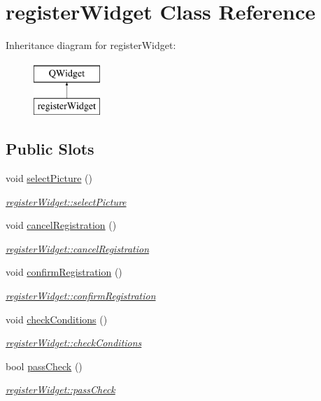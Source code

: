\hypertarget{classregisterWidget}{\section{register\-Widget Class Reference}
\label{classregisterWidget}
}
Inheritance diagram for register\-Widget\-:\begin{figure}[H]
\begin{center}
\leavevmode
\includegraphics[height=2.000000cm]{classregisterWidget}
\end{center}
\end{figure}
\subsection*{Public Slots}
\begin{DoxyCompactItemize}
\item 
void \hyperlink{classregisterWidget_a69c2a6929e0adbd79b215812cb7c582f}{select\-Picture} ()
\begin{DoxyCompactList}\small\item\em \hyperlink{classregisterWidget_a69c2a6929e0adbd79b215812cb7c582f}{register\-Widget\-::select\-Picture} \end{DoxyCompactList}\item 
void \hyperlink{classregisterWidget_a571a61e4b370f821cc5521cca9be9747}{cancel\-Registration} ()
\begin{DoxyCompactList}\small\item\em \hyperlink{classregisterWidget_a571a61e4b370f821cc5521cca9be9747}{register\-Widget\-::cancel\-Registration} \end{DoxyCompactList}\item 
void \hyperlink{classregisterWidget_a4ffafb671340ca427f83fc2e8786f1ab}{confirm\-Registration} ()
\begin{DoxyCompactList}\small\item\em \hyperlink{classregisterWidget_a4ffafb671340ca427f83fc2e8786f1ab}{register\-Widget\-::confirm\-Registration} \end{DoxyCompactList}\item 
void \hyperlink{classregisterWidget_a80831e38d1681a00ac77e43b6f044589}{check\-Conditions} ()
\begin{DoxyCompactList}\small\item\em \hyperlink{classregisterWidget_a80831e38d1681a00ac77e43b6f044589}{register\-Widget\-::check\-Conditions} \end{DoxyCompactList}\item 
bool \hyperlink{classregisterWidget_ab26d894be588c87a21f61b45674b4a43}{pass\-Check} ()
\begin{DoxyCompactList}\small\item\em \hyperlink{classregisterWidget_ab26d894be588c87a21f61b45674b4a43}{register\-Widget\-::pass\-Check} \end{DoxyCompactList}\end{DoxyCompactItemize}
